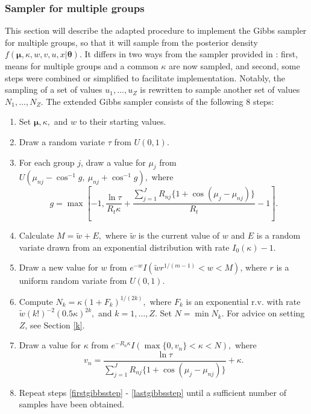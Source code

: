 \documentclass[bib]{ba/ba}
\begin{document}
\subsubsection{Sampler for multiple groups \label{gibbsmulti}}

This section will describe the adapted procedure to implement the Gibbs sampler for multiple groups, so that it will sample from the posterior density $f(\boldsymbol\mu, \kappa, w, v, u, x \vert \boldsymbol\theta)$. It differs in two ways from the sampler provided in \citet{damien1999fullbayes}: first, means for multiple groups and a common $\kappa$ are now sampled, and second, some steps were combined or simplified to facilitate implementation. Notably, the sampling of a set of values $u_1, \dots, u_Z$ is rewritten to sample another set of values $N_1, \dots, N_Z$. The extended Gibbs sampler consists of the following 8 steps:

\begin{enumerate}



\item Set $\boldsymbol\mu, \kappa,$ and $w$ to their starting values.  

\item  Draw a random variate $\tau$ from $U(0, 1)$. \label{firstgibbsstep}

\item  For each group $j$, draw a value for $\mu_j$ from $U(\mu_{nj} - \cos^{-1}g,~ \mu_{nj} + \cos^{-1}g),$ where $$ g=\max\left[-1, \frac{\ln \tau}{R_t \kappa} + \frac{\sum_{j=1}^{J} R_{nj} \{ 1 + \cos (\mu_j - \mu_{nj} ) \} } {R_t} - 1 \right]. $$

\item Calculate $ M = \tilde{w} + E,$ where $\tilde{w}$ is the current value of $w$ and $E$ is a random variate drawn from an exponential distribution with rate $I_0(\kappa) - 1$.

\item  Draw a new value for $w$ from $e^{-w} I(\tilde{w}r^{1/(m-1)} < w < M)$, where $r$ is a uniform random variate from $U(0,1)$. 

\item Compute $ N_k = \kappa (1 + F_k)^{1/(2k)},$ where $F_k$ is an exponential r.v. with rate $\tilde{w}(k!)^{-2} (0.5\kappa )^{2k},$ and $k = 1, \dots, Z$. Set $N = \min N_k$. For advice on setting $Z$, see Section \ref{k}. \label{alg:Nkselection} 

\item  Draw a value for $\kappa$ from $e^{-R_n\kappa} I( \max\{0, v_n\} < \kappa < N),$ where $$ v_n = \frac{\ln \tau}{\sum_{j=1}^{J} R_{nj} \{1+\cos(\mu_j - \mu_{nj}) \} } + \kappa.$$ \label{lastgibbsstep}

\item Repeat steps \ref{firstgibbsstep} - \ref{lastgibbsstep} until a sufficient number of samples have been obtained.

\end{enumerate}  
\end{document}
